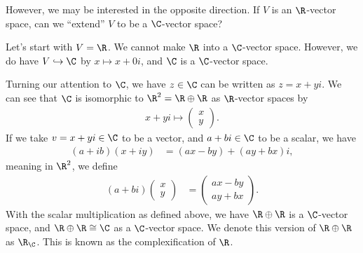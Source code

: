 \documentclass[10pt]{mypackage}
\begin{document}
However, we may be interested in the opposite direction. If $V$ is an $\R$-vector space, can we ``extend'' $V$ to be a $\C$-vector space?
\begin{example}
Let's start with $V = \R$. We cannot make $\R$ into a $\C$-vector space. However, we do have $V\hookrightarrow \C$ by $x\mapsto x + 0i$, and $\C$ is a $\C$-vector space.\newline

Turning our attention to $\C$, we have $z\in \C$ can be written as $z = x + yi$. We can see that $\C$ is isomorphic to $\R^2 = \R\oplus \R$ as $\R$-vector spaces by
\begin{align*}
  x + yi \mapsto \begin{pmatrix}x\\y\end{pmatrix}.
\end{align*}
If we take $v = x + yi\in \C$ to be a vector, and $a + bi\in \C$ to be a scalar, we have
\begin{align*}
  \left(a + ib\right)\left(x + iy\right) &= \left(ax-by\right) + \left(ay+bx\right)i,
\end{align*}
meaning in $\R^2$, we define
\begin{align*}
  \left(a + bi\right) \begin{pmatrix}x\\y\end{pmatrix} &= \begin{pmatrix}ax-by\\ay+bx\end{pmatrix}.
\end{align*}
With the scalar multiplication as defined above, we have $\R\oplus\R$ is a $\C$-vector space, and $\R\oplus \R\cong \C$ as a $\C$-vector space. We denote this version of $\R\oplus\R$ as $\R_{\C}$. This is known as the complexification of $\R$.
\end{example}
\end{document}

